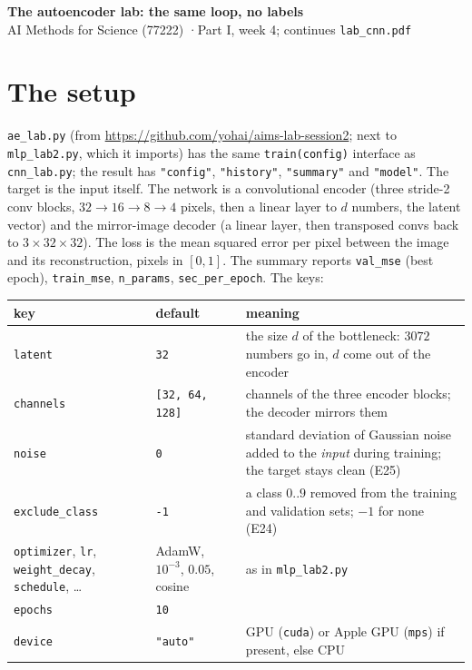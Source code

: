 \documentclass[11pt]{article}
\newcommand{\code}[1]{\texttt{#1}}
\begin{document}
\sloppy
\begin{center}
{\Large\bfseries The autoencoder lab: the same loop, no labels}\\[3pt]
AI Methods for Science (77222) \quad·\quad Part I, week 4; continues \code{lab\_cnn.pdf}
\end{center}

\section*{The setup}
\code{ae\_lab.py} (from \url{https://github.com/yohai/aims-lab-session2}; next to \code{mlp\_lab2.py}, which it imports) has the same \code{train(config)} interface as \code{cnn\_lab.py}; the result has \code{"config"}, \code{"history"}, \code{"summary"} and \code{"model"}. The target is the input itself. The network is a convolutional encoder (three stride-2 conv blocks, $32\to16\to8\to4$ pixels, then a linear layer to $d$ numbers, the latent vector) and the mirror-image decoder (a linear layer, then transposed convs back to $3\times32\times32$). The loss is the mean squared error per pixel between the image and its reconstruction, pixels in $[0,1]$. The summary reports \code{val\_mse} (best epoch), \code{train\_mse}, \code{n\_params}, \code{sec\_per\_epoch}. The keys:
\begin{center}\small
\begin{tabular}{@{}L{3.9cm}L{2.9cm}L{9.4cm}@{}}
\toprule
key & default & meaning \\
\midrule
\code{latent} & \code{32} & the size $d$ of the bottleneck: $3072$ numbers go in, $d$ come out of the encoder \\
\code{channels} & \code{[32, 64, 128]} & channels of the three encoder blocks; the decoder mirrors them \\
\code{noise} & \code{0} & standard deviation of Gaussian noise added to the \emph{input} during training; the target stays clean (E25) \\
\code{exclude\_class} & \code{-1} & a class $0..9$ removed from the training and validation sets; $-1$ for none (E24) \\
\code{optimizer}, \code{lr}, \code{weight\_decay}, \code{schedule}, \dots & AdamW, $10^{-3}$, $0.05$, cosine & as in \code{mlp\_lab2.py} \\
\code{epochs} & \code{10} & \\
\code{device} & \code{"auto"} & GPU (\code{cuda}) or Apple GPU (\code{mps}) if present, else CPU \\
\bottomrule
\end{tabular}
\end{center}
\end{document}
